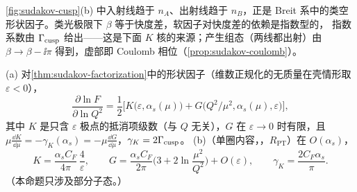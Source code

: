 \cref{fig:sudakov-cusp}(b) 中入射线趋于 $n_A$、出射线趋于 $n_B$，正是 Breit 系中的类空形状因子。类光极限下 $\beta$ 等于快度差，软因子对快度差的依赖是指数型的，
指数系数由 $\Gamma_{\rm cusp}$ 给出——这是下面 $K$ 核的来源；产生组态（两线都出射）由 $\beta\to\beta-\ii\pi$ 得到，虚部即 Coulomb 相位（\cref{prop:sudakov-coulomb}）。

\begin{proposition}\label{prop:sudakov-kg}
(a) 对\cref{thm:sudakov-factorization}中的形状因子（维数正规化的无质量在壳情形取 $\varepsilon<0$），
\begin{equation}\label{eq:sudakov-KG}
\frac{\partial\ln F}{\partial\ln Q^2}=\frac12\Big[K\big(\varepsilon,\alpha_s(\mu)\big)+G\big(Q^2/\mu^2,\alpha_s(\mu),\varepsilon\big)\Big],
\end{equation}
其中 $K$ 是只含 $\varepsilon$ 极点的抵消项级数（与 $Q$ 无关），$G$ 在 $\varepsilon\to0$ 时有限，且
$\mu\frac{\dd K}{\dd\mu}=-\gamma_K(\alpha_s)=-\mu\frac{\dd G}{\dd\mu}$，$\gamma_K=2\Gamma_{\rm cusp}$。
(b)（单圈内容，\tagR，$R_{\mathrm{PT}}$）在 $O(\alpha_s)$，
\begin{equation}\label{eq:sudakov-KG-1loop}
K=\frac{\alpha_sC_F}{4\pi}\,\frac4\varepsilon,\qquad G=\frac{\alpha_sC_F}{2\pi}\Big(3+2\ln\frac{\mu^2}{Q^2}\Big)+O(\varepsilon),\qquad
\gamma_K=\frac{2C_F\alpha_s}{\pi}.
\end{equation}
（本命题只涉及部分子态。）
\end{proposition}


